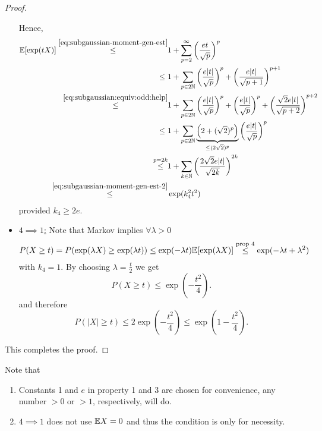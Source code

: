 \begin{lemma}
\begin{proof}
\begin{itemize}
 Hence,
 \begin{equation*}
 \begin{split}
 \mathbb{E}[\exp(tX)] \overset{\eqref{eq:subgaussian-moment-gen-est}}{\leq} & 1+ \sum_{p=2}^\infty \left(
\frac{et}{\sqrt{p}}
\right)^p	\\
\leq \ &	1+
\sum_{p\in 2\mathbb{N}}\left(
\frac{e|t|}{\sqrt{p}}
\right)^p + \left(
\frac{e|t|}{\sqrt{p+1}}
\right)^{p+1} \\
\overset{\eqref{eq:subgaussian:equiv:odd:help}}{\leq} & 1+ \sum_{p\in2\mathbb{N}}  \left(
\frac{e|t|}{\sqrt{p}}
\right)^p +  \left(
\frac{e|t|}{\sqrt{p}}
\right)^p  + \left(
\frac{\sqrt{2}e|t|}{\sqrt{p+2}}
\right)^{p+2}	\\
\leq \ & 1 + \sum_{p\in 2\mathbb{N}} \underbrace{\left(2+(\sqrt{2})^p\right)}_{\leq (2\sqrt{2})^p}  \left(
\frac{e|t|}{\sqrt{p}}
\right)^p \\
\overset{p=2k}\leq  &	1+\sum_{k\in \mathbb{N}}\left(
\frac{2\sqrt{2}e|t|}{\sqrt{2k}}
\right)^{2k} 
\\
\overset{\eqref{eq:subgaussian-moment-gen-est-2}}\leq & \exp(k_4^2t^2)
\end{split}
 \end{equation*}
 provided $k_4 \geq 2e$.
 \item \underline{$4\implies 1$:} Note that Markov implies $\forall \lambda>0$
 \begin{equation*}
 \begin{split}
 P(X\geq t) = P (\exp(\lambda X) \geq \exp(\lambda t)) \leq  \exp(-\lambda t) \mathbb{E}[\exp(\lambda X)]
 \end{split} \overset{\text{prop 4}}\leq \exp(-\lambda t+\lambda^2)
 \end{equation*}
 with $k_4=1$. By choosing $\lambda = \frac{t}{2}$ we get
 $$P(X\geq t) \leq \exp\left(
-\frac{t^2}{4} 
 \right).$$
 and therefore $$
P(|X|\geq t)\leq 2 \exp\left(
-\frac{t^2}{4}
\right) \leq \exp\left(1-\frac{t^2}{4}\right).
$$
\end{itemize}
This completes the proof.
\end{proof}
\begin{remark*}Note that \vspace{-0.5pc}
\begin{enumerate}
\item Constants 1 and $e$ in property 1 and 3 are chosen for convenience, any number $>0$ or $>1$, respectively, will do.
\item $4\implies 1$ does not use $\mathbb{E} X=0$ and thus the condition is only for necessity.
\end{enumerate}
\end{remark*}
\end{lemma}
